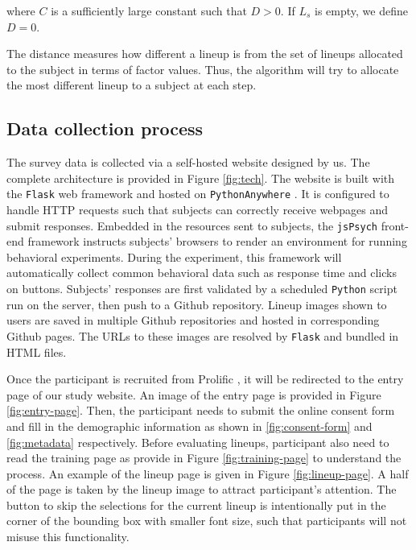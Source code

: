 \documentclass[]{interact}
\theoremstyle{plain}%
\theoremstyle{definition}
\theoremstyle{remark}
\begin{document}
\normalsize

where \(C\) is a sufficiently large constant such that \(D > 0\). If
\(L_{s}\) is empty, we define \(D = 0\).

The distance measures how different a lineup is from the set of lineups
allocated to the subject in terms of factor values. Thus, the algorithm
will try to allocate the most different lineup to a subject at each
step.

\hypertarget{data-collection-process}{%
\subsection{Data collection process}\label{data-collection-process}}

The survey data is collected via a self-hosted website designed by us.
The complete architecture is provided in Figure \ref{fig:tech}. The
website is built with the \texttt{Flask} \citep{flask} web framework and
hosted on \texttt{PythonAnywhere} \citep{pythonanywhere}. It is
configured to handle HTTP requests such that subjects can correctly
receive webpages and submit responses. Embedded in the resources sent to
subjects, the \texttt{jsPsych} front-end framework \citep{jspsych}
instructs subjects' browsers to render an environment for running
behavioral experiments. During the experiment, this framework will
automatically collect common behavioral data such as response time and
clicks on buttons. Subjects' responses are first validated by a
scheduled \texttt{Python} script run on the server, then push to a
Github repository. Lineup images shown to users are saved in multiple
Github repositories and hosted in corresponding Github pages. The URLs
to these images are resolved by \texttt{Flask} and bundled in HTML
files.

Once the participant is recruited from Prolific
\citep{palan2018prolific}, it will be redirected to the entry page of
our study website. An image of the entry page is provided in Figure
\ref{fig:entry-page}. Then, the participant needs to submit the online
consent form and fill in the demographic information as shown in
\ref{fig:consent-form} and \ref{fig:metadata} respectively. Before
evaluating lineups, participant also need to read the training page as
provide in Figure \ref{fig:training-page} to understand the process. An
example of the lineup page is given in Figure \ref{fig:lineup-page}. A
half of the page is taken by the lineup image to attract participant's
attention. The button to skip the selections for the current lineup is
intentionally put in the corner of the bounding box with smaller font
size, such that participants will not misuse this functionality.
\end{document}
